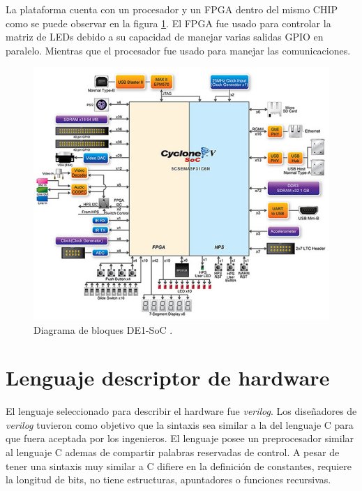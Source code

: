 
La plataforma cuenta con un procesador y un FPGA dentro del mismo CHIP como se puede observar en la figura  \ref{fig:DE1BLOCK}. El FPGA fue usado para controlar la matriz de LEDs debido a su capacidad de manejar varias salidas GPIO en paralelo. Mientras que el procesador fue usado para manejar las comunicaciones.

\begin{figure}[htpb]
	\centering
	\includegraphics[scale=0.4]{Figures/fpgablock.jpg}  
	\caption{Diagrama de bloques DE1-SoC \protect\footnotemark.}
	\label{fig:DE1BLOCK}
\end{figure}



\section{Lenguaje descriptor de hardware}


El lenguaje seleccionado para describir el hardware fue \textit{verilog}. Los diseñadores de \textit{verilog} tuvieron como objetivo que la sintaxis sea similar a la del lenguaje C para que fuera aceptada por los ingenieros. El lenguaje posee un preprocesador similar al lenguaje C ademas de compartir palabras reservadas de control. A pesar de tener una sintaxis muy similar a C difiere en la definición de constantes, requiere la longitud de bits, no tiene estructuras, apuntadores o funciones recursivas. 


